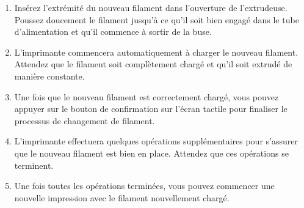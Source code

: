\documentclass{Thesis}
\begin{document}
\begin{enumerate}
    \item Insérez l'extrémité du nouveau filament dans l'ouverture de l'extrudeuse. Poussez doucement le filament jusqu'à ce qu'il soit bien engagé dans le tube d'alimentation et qu'il commence à sortir de la buse.
    \item L'imprimante commencera automatiquement à charger le nouveau filament. Attendez que le filament soit complètement chargé et qu'il soit extrudé de manière constante.
    \item Une fois que le nouveau filament est correctement chargé, vous pouvez appuyer sur le bouton de confirmation sur l'écran tactile pour finaliser le processus de changement de filament.
    \item L'imprimante effectuera quelques opérations supplémentaires pour s'assurer que le nouveau filament est bien en place. Attendez que ces opérations se terminent.
    \item Une fois toutes les opérations terminées, vous pouvez commencer une nouvelle impression avec le filament nouvellement chargé.
\end{enumerate}
\end{document}
